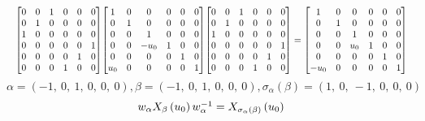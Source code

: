 \documentclass[11pt]{article}
\theoremstyle{definition}
\begin{document}
\[
\scaletoalign{\textwidth}{{\left[\begin{matrix}0 & 0 & 1 & 0 & 0 & 0\\0 & 1 & 0 & 0 & 0 & 0\\1 & 0 & 0 & 0 & 0 & 0\\0 & 0 & 0 & 0 & 0 & 1\\0 & 0 & 0 & 0 & 1 & 0\\0 & 0 & 0 & 1 & 0 & 0\end{matrix}\right]} {\left[\begin{matrix}1 & 0 & 0 & 0 & 0 & 0\\0 & 1 & 0 & 0 & 0 & 0\\0 & 0 & 1 & 0 & 0 & 0\\0 & 0 & - u_{0} & 1 & 0 & 0\\0 & 0 & 0 & 0 & 1 & 0\\u_{0} & 0 & 0 & 0 & 0 & 1\end{matrix}\right]} {\left[\begin{matrix}0 & 0 & 1 & 0 & 0 & 0\\0 & 1 & 0 & 0 & 0 & 0\\1 & 0 & 0 & 0 & 0 & 0\\0 & 0 & 0 & 0 & 0 & 1\\0 & 0 & 0 & 0 & 1 & 0\\0 & 0 & 0 & 1 & 0 & 0\end{matrix}\right]} = {\left[\begin{matrix}1 & 0 & 0 & 0 & 0 & 0\\0 & 1 & 0 & 0 & 0 & 0\\0 & 0 & 1 & 0 & 0 & 0\\0 & 0 & u_{0} & 1 & 0 & 0\\0 & 0 & 0 & 0 & 1 & 0\\- u_{0} & 0 & 0 & 0 & 0 & 1\end{matrix}\right]}}
\]
\[
\alpha = \left( -1, \  0, \  1, \  0, \  0, \  0\right), \beta = \left( -1, \  0, \  1, \  0, \  0, \  0\right), \sigma_{\alpha}(\beta) = \left( 1, \  0, \  -1, \  0, \  0, \  0\right)
\]
\[
\scaletoalign{\textwidth}{w_{\alpha} X_{\beta}\left(u_{0}\right) w_{\alpha}^{-1} = X_{\sigma_{\alpha}\left(\beta\right)}\left(u_{0}\right)}
\]
\end{document}
